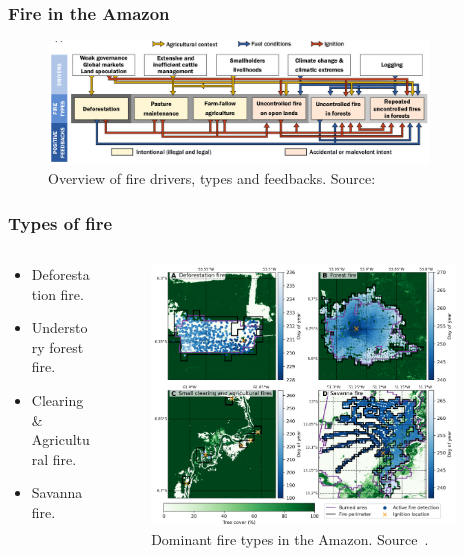 \documentclass[aspectratio=169]{beamer}
\begin{document}

\begin{frame}
  \frametitle{Fire in the Amazon}
  \begin{figure}
    \centering
    \includegraphics[width=0.9\textwidth]
    {img/amazonian_fires_drivers_types_feedbacks.png}
    \caption{Overview of fire drivers, types and feedbacks. 
             Source:~\cite{barlow2020}}
    \label{fir:fire_drivers}
  \end{figure}
\end{frame}

\begin{frame}
  \frametitle{Types of fire}
  \begin{columns}
    \begin{column}{0.4\textwidth}
      \begin{itemize}
        \item Deforestation fire.
        \item Understory forest fire.
        \item Clearing \& Agricultural fire.
        \item Savanna fire.
      \end{itemize}
    \end{column}
    \begin{column}{0.6\textwidth}
      \begin{figure}
        \centering
        \includegraphics[width=0.95\textwidth]{img/fire_types.png}
        \caption{Dominant fire types in the Amazon. Source~\cite{andela2022}.}
      \end{figure}
    \end{column}
  \end{columns}
\end{frame}
\end{document}
